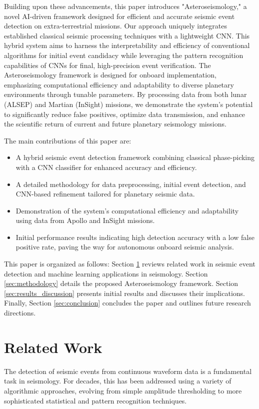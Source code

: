 \documentclass[conference]{IEEEtran}
\begin{document}
Building upon these advancements, this paper introduces "Asteroseismology," a novel AI-driven framework designed for efficient and accurate seismic event detection on extra-terrestrial missions. Our approach uniquely integrates established classical seismic processing techniques with a lightweight CNN. This hybrid system aims to harness the interpretability and efficiency of conventional algorithms for initial event candidacy while leveraging the pattern recognition capabilities of CNNs for final, high-precision event verification. The Asteroseismology framework is designed for onboard implementation, emphasizing computational efficiency and adaptability to diverse planetary environments through tunable parameters. By processing data from both lunar (ALSEP) and Martian (InSight) missions, we demonstrate the system's potential to significantly reduce false positives, optimize data transmission, and enhance the scientific return of current and future planetary seismology missions.

The main contributions of this paper are:
\begin{itemize}
    \item A hybrid seismic event detection framework combining classical phase-picking with a CNN classifier for enhanced accuracy and efficiency.
    \item A detailed methodology for data preprocessing, initial event detection, and CNN-based refinement tailored for planetary seismic data.
    \item Demonstration of the system's computational efficiency and adaptability using data from Apollo and InSight missions.
    \item Initial performance results indicating high detection accuracy with a low false positive rate, paving the way for autonomous onboard seismic analysis.
\end{itemize}

This paper is organized as follows: Section \ref{sec:related_work} reviews related work in seismic event detection and machine learning applications in seismology. Section \ref{sec:methodology} details the proposed Asteroseismology framework. Section \ref{sec:results_discussion} presents initial results and discusses their implications. Finally, Section \ref{sec:conclusion} concludes the paper and outlines future research directions.

\section{Related Work}
\label{sec:related_work}
The detection of seismic events from continuous waveform data is a fundamental task in seismology. For decades, this has been addressed using a variety of algorithmic approaches, evolving from simple amplitude thresholding to more sophisticated statistical and pattern recognition techniques.
\end{document}
